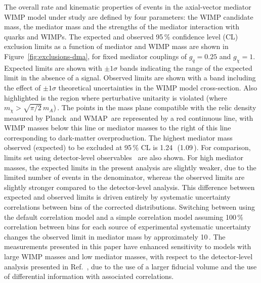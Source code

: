 \documentclass[cernpreprint,txfonts,UKenglish,texlive=2016]{\ATLASLATEXPATH atlasdoc}
\begin{document}
The overall rate and kinematic properties of events in the axial-vector mediator WIMP model 
under study are defined by four parameters: the WIMP candidate mass, the mediator mass and 
the strengths of the mediator interaction with quarks and WIMPs.
The expected and observed 95\,\% confidence level (CL) exclusion limits as a function of mediator 
and WIMP mass are shown in Figure~\ref{fig:exclusions-dma}, for fixed mediator couplings of $g_q = 0.25$ and $g_\chi = 1$.
Expected limits are shown with $\pm 1\sigma$ bands indicating the range of the expected limit 
in the absence of a signal. Observed limits are shown with a band including the effect of 
$\pm 1\sigma$ theoretical uncertainties in the WIMP model cross-section.
Also highlighted is the region where perturbative unitarity is violated (where 
$m_\chi>\sqrt{\pi/2}\,m_A$)\,\cite{Kahlhoefer:2015bea}. The points in the mass plane compatible with the
relic density measured by Planck\,\cite{Adam:2015rua} and
WMAP\,\cite{WMAP} are represented by a red continuous line, with WIMP
masses below this line or mediator masses to the right of this
line corresponding to dark-matter overproduction.  
The highest mediator mass observed (expected) to be excluded at 95\,\% CL is 1.24\,\TeV\ (1.09\,\TeV).
For comparison, limits set using detector-level observables~\cite{EXOT-2015-03} are also shown. 
For high mediator masses, the expected limits in the present analysis are slightly weaker, 
due to the limited number of events in the denominator, whereas the observed limits are slightly stronger
compared to the detector-level analysis.
This difference between expected and observed limits is driven entirely by systematic uncertainty correlations 
between bins of the corrected distributions.
Switching between using the default correlation model and a simple correlation model
assuming 100\,\% correlation between bins for each source of experimental systematic uncertainty changes the observed limit in
mediator mass by approximately 10\,\GeV.
The measurements presented in this paper 
have enhanced sensitivity to models with large WIMP masses and low mediator masses, with respect to the detector-level analysis
presented in Ref.~\cite{EXOT-2015-03}, 
due to the use of a larger fiducial volume and the use of differential information with associated correlations.
\end{document}
